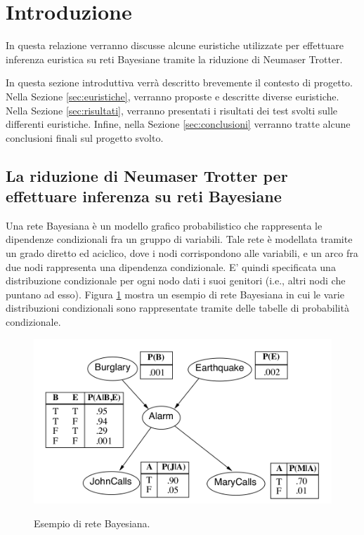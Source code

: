 \section{Introduzione}
\label{sec:introduzione}


In questa relazione verranno discusse alcune euristiche utilizzate per effettuare inferenza euristica su reti Bayesiane tramite la riduzione di Neumaser Trotter. 

In questa sezione introduttiva verrà descritto brevemente il contesto di progetto. Nella Sezione \ref{sec:euristiche}, verranno proposte e descritte diverse euristiche. Nella Sezione \ref{sec:risultati}, verranno presentati i risultati dei test svolti sulle differenti euristiche. Infine, nella Sezione \ref{sec:conclusioni} verranno tratte alcune conclusioni finali sul progetto svolto.

\subsection{La riduzione di Neumaser Trotter per effettuare inferenza su reti Bayesiane}
Una rete Bayesiana è un modello grafico probabilistico che rappresenta le dipendenze condizionali fra un gruppo di variabili. Tale rete è modellata tramite un grado diretto ed aciclico, dove i nodi corrispondono alle variabili, e un arco fra due nodi rappresenta una dipendenza condizionale. E' quindi specificata una distribuzione condizionale per ogni nodo dati i suoi genitori (i.e., altri nodi che puntano ad esso). Figura \ref{fig:reteB} mostra un esempio di rete Bayesiana in cui le varie distribuzioni condizionali sono rappresentate tramite delle tabelle di probabilità condizionale.

\begin{figure}[htbp]
\includegraphics[width=\textwidth]{res/img/reteBayesiana.png}
\label{fig:reteB}
\caption{Esempio di rete Bayesiana.}
\end{figure}

